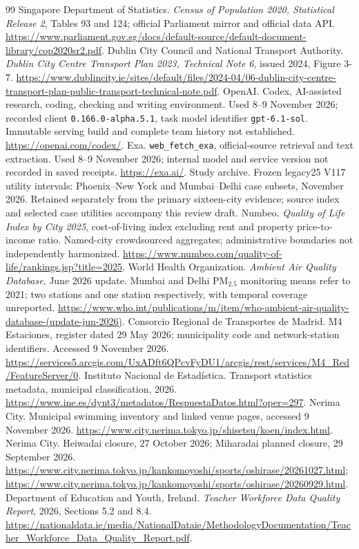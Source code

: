 \begin{thebibliography}{99}
 Singapore Department of Statistics. \textit{Census of
Population 2020, Statistical Release 2}, Tables 93 and 124; official Parliament
mirror and official data API.
\url{https://www.parliament.gov.sg/docs/default-source/default-document-library/cop2020sr2.pdf}.
 Dublin City Council and National Transport Authority.
\textit{Dublin City Centre Transport Plan 2023, Technical Note 6},
issued 2024, Figure 3-7.
\url{https://www.dublincity.ie/sites/default/files/2024-04/06-dublin-city-centre-transport-plan-public-transport-technical-note.pdf}.
\CaseReferences
{} OpenAI. Codex, AI-assisted research, coding, checking and writing
environment. Used 8--9 November 2026; recorded client
\texttt{0.166.0-alpha.5.1}, task model identifier \texttt{gpt-6.1-sol}.
Immutable serving build and complete team history not established.
\url{https://openai.com/codex/}.
 Exa. \texttt{web\_fetch\_exa}, official-source retrieval and text
extraction. Used 8--9 November 2026; internal model and service version not
recorded in saved receipts. \url{https://exa.ai/}.
 Study archive. Frozen legacy25 V117 utility intervals:
Phoenix--New York and Mumbai--Delhi case subsets, November 2026. Retained
separately from the primary sixteen-city evidence; source index and selected
case utilities accompany this review draft.
 Numbeo. \textit{Quality of Life Index by City 2025},
cost-of-living index excluding rent and property price-to-income ratio.
Named-city crowdsourced aggregates; administrative boundaries not
independently harmonized.
\url{https://www.numbeo.com/quality-of-life/rankings.jsp?title=2025}.
 World Health Organization. \textit{Ambient Air Quality Database},
June 2026 update. Mumbai and Delhi PM$_{2.5}$ monitoring means refer to 2021;
two stations and one station respectively, with temporal coverage unreported.
\url{https://www.who.int/publications/m/item/who-ambient-air-quality-database-(update-jun-2026)}.
 Consorcio Regional de Transportes de Madrid. M4 Estaciones, register dated 29 May 2026; municipality code and network-station identifiers. Accessed 9 November 2026.
\url{https://services5.arcgis.com/UxADft6QPcvFyDU1/arcgis/rest/services/M4_Red/FeatureServer/0}.
 Instituto Nacional de Estad\'istica. Transport statistics metadata, municipal classification, 2026.
\url{https://www.ine.es/dynt3/metadatos/RespuestaDatos.html?oper=297}.
 Nerima City. Municipal swimming inventory and linked venue pages, accessed 9 November 2026.
\url{https://www.city.nerima.tokyo.jp/shisetsu/koen/index.html}.
 Nerima City. Heiwadai closure, 27 October 2026; Miharadai planned closure, 29 September 2026.
\url{https://www.city.nerima.tokyo.jp/kankomoyoshi/sports/oshirase/20261027.html};
\url{https://www.city.nerima.tokyo.jp/kankomoyoshi/sports/oshirase/20260929.html}.
 Department of Education and Youth, Ireland. \textit{Teacher Workforce Data Quality Report}, 2026, Sections 5.2 and 8.4.
\url{https://nationaldata.ie/media/NationalDataie/MethodologyDocumentation/Teacher_Workforce_Data_Quality_Report.pdf}.
\end{thebibliography}
